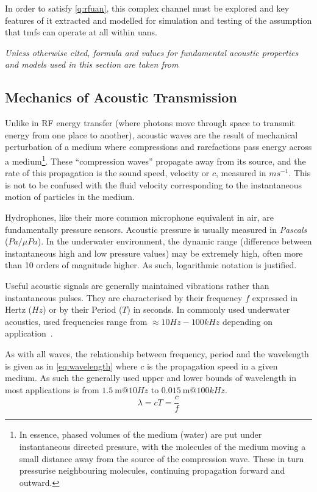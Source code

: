 In order to satisfy \autoref{q:rfuan}, this complex channel must be explored and key features of it extracted and modelled for simulation and testing of the assumption that \glspl{tmf} can operate at all within \glspl{uan}.

\emph{Unless otherwise cited, formula and values for fundamental acoustic properties and models used in this section are taken from \citet{Urick1983}}

\subsection{Mechanics of Acoustic Transmission}

Unlike in RF energy transfer (where photons move through space to transmit energy from one place to another), acoustic waves are the result of mechanical perturbation of a medium where compressions and rarefactions pass energy across a medium\footnote{In essence, phased volumes of the medium (water) are put under instantaneous directed pressure, with the molecules of the medium moving a small distance away from the source of the compression wave. These in turn pressurise neighbouring molecules, continuing propagation forward and outward.}.
These ``compression waves'' propagate away from its source, and the rate of this propagation is the sound speed, velocity or $c$, measured in $ms^{-1}$.
This is not to be confused with the fluid velocity corresponding to the instantaneous motion of particles in the medium.

Hydrophones, like their more common microphone equivalent in air, are fundamentally pressure sensors.
Acoustic pressure is usually measured in \emph{Pascals} ($Pa/\mu Pa$). 
In the underwater environment, the dynamic range (difference between instantaneous high and low pressure values) may be extremely high, often more than 10 orders of magnitude higher. 
As such, logarithmic notation is justified.

Useful acoustic signals are generally maintained vibrations rather than instantaneous pulses.
They are characterised by their frequency $f$ expressed in Hertz ($Hz$) or by their Period ($T$) in seconds.
In commonly used underwater acoustics, used frequencies range from $\approx 10Hz-100kHz$ depending on application~\cite{Stojanovic2007}.

As with all waves, the relationship between frequency, period and the wavelength is given as in \autoref{eq:wavelength} where $c$ is the propagation speed in a given medium. 
As such the generally used upper and lower bounds of wavelength in most applications is from $\SI{1.5}{\meter} @ 10Hz$ to $\SI{0.015}{\meter} @ 100kHz$.
%
\begin{equation}
  \lambda = cT = \frac{c}{f}
  \label{eq:wavelength}
\end{equation}
%

